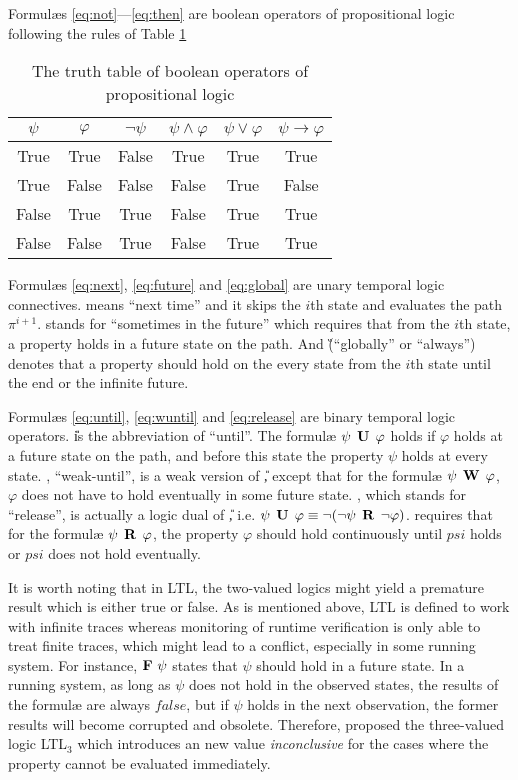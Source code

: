 Formul\ae{}s \ref{eq:not}---\ref{eq:then} are boolean operators of propositional logic following the rules of Table \ref{table:prologic}

\begin{table}[h]
\centering
\begin{tabular}{|c|c|c|c|c|c|}
\hline
$\psi$ & $\varphi$ & $\neg\psi$ & $\psi \wedge \varphi$ & $\psi \vee \varphi$ & $\psi \rightarrow \varphi$ \\
\hline
True & True & False & True & True & True \\
\hline
True & False & False & False & True & False \\
\hline
False & True & True & False & True & True \\
\hline
False & False & True & False & True & True \\
\hline
\end{tabular}
\caption{The truth table of boolean operators of propositional logic}
\label{table:prologic}
\end{table}

Formul\ae{}s \ref{eq:next}, \ref{eq:future} and \ref{eq:global} are unary temporal logic connectives.
\X means ``next time'' and it skips the $i$th state and evaluates the path $\pi^{i+1}$. \F stands for ``sometimes in the future'' which requires that from the $i$th state, a property holds in a future state on the path. And \G (``globally'' or ``always'') denotes that a property should hold on the every state from the $i$th state until the end or the infinite future.

Formul\ae{}s \ref{eq:until}, \ref{eq:wuntil} and \ref{eq:release} are binary temporal logic operators. \U is the abbreviation of ``until''. The formul\ae{} $\psi \mathrel{\mbox{\,\textbf{U}}}\, \varphi$ holds if $\varphi$ holds at a future state on the path, and before this state the property $\psi$ holds at every state. \W, ``weak-until'', is a weak version of \U, except that for the formul\ae{} $\psi \mathrel{\mbox{\,\textbf{W}}}\, \varphi$, $\varphi$ does not have to hold eventually in some future state. \R, which stands for ``release'', is actually a logic dual of \U, i.e. $\psi \mathrel{\mbox{\,\textbf{U}}}\, \varphi \equiv \neg(\neg\psi \mathrel{\mbox{\,\textbf{R}}}\, \neg\varphi)$. \R requires that for the formul\ae{} $\psi \mathrel{\mbox{\,\textbf{R}}}\, \varphi$, the property $\varphi$ should hold continuously until $psi$ holds or $psi$ does not hold eventually.

It is worth noting that in LTL, the two-valued logics might yield a premature result which is either true or false. As is mentioned above, LTL is defined to work with infinite traces whereas monitoring of runtime verification is only able to treat finite traces, which might lead to a conflict, especially in some running system. For instance, $\mathop{\mbox{\textbf{F}}}\, \psi$ states that $\psi$ should hold in a future state. In a running system, as long as $\psi$ does not hold in the observed states, the results of the formul\ae{} are always $false$, but if $\psi$ holds in the next observation, the former results will become corrupted and obsolete. Therefore, \cite{bauer2006monitoring} proposed the three-valued logic LTL$_3$ which introduces an new value \emph{inconclusive} for the cases where the property cannot be evaluated immediately.

